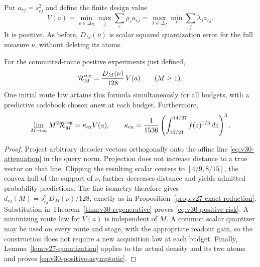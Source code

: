 Put $a_{rj}=s_{rj}^2$ and define the finite design value
\begin{equation}\label{eq:v30-design}
 V(a)=\min_{\rho\in\Delta_R}\max_j\sum_r\rho_r a_{rj}
     =\max_{\lambda\in\Delta_J}\min_r\sum_j\lambda_j a_{rj}.
\end{equation}
It is positive. As before, $D_M(\nu)$ is scalar squared quantization
error for the full measure $\nu$, without deleting its atoms.

\begin{theorem}
\label{thm:v30-positive-realization}
For the committed-route positive experiments just defined,
\begin{equation}\label{eq:v30-positive-risk}
                \mathcal R_M^{\rm reg}
                      =\frac{D_M(\nu)}{128}\,V(a)
                         \qquad(M\ge1).
\end{equation}
One initial route law attains this formula simultaneously for all
budgets, with a predictive codebook chosen anew at each budget.
Furthermore,
\begin{equation}\label{eq:v30-positive-asymptotic}
 \lim_{M\to\infty}M^2\mathcal R_M^{\rm reg}
 =\kappa_{\rm ex}V(a),\qquad
 \kappa_{\rm ex}=\frac1{1536}
               \left(\int_{10/21}^{14/27}f(z)^{1/3}\,dz\right)^3.
\end{equation}
\end{theorem}
\begin{proof}
Project arbitrary decoder vectors orthogonally onto the affine line
\eqref{eq:v30-attenuation} in the query norm. Projection does not
increase distance to a true vector on that line. Clipping the resulting
scalar centers to $[4/9,8/15]$, the convex hull of the support of $\nu$,
further decreases distance and yields admitted probability predictions.
The line isometry therefore gives
$d_{rj}(M)=s_{rj}^2D_M(\nu)/128$, exactly as in
Proposition~\ref{prop:v27-exact-reduction}. Substitution in
Theorem~\ref{thm:v30-regenerative} proves \eqref{eq:v30-positive-risk}.
A minimizing route law for $V(a)$ is independent of $M$. A common
scalar quantizer may be used on every route and stage, with the
appropriate readout gain, so the construction does not require a new
acquisition law at each budget. Finally,
Lemma~\ref{lem:v27-quantization} applies to the actual density and its
two atoms and proves \eqref{eq:v30-positive-asymptotic}.
\end{proof}

